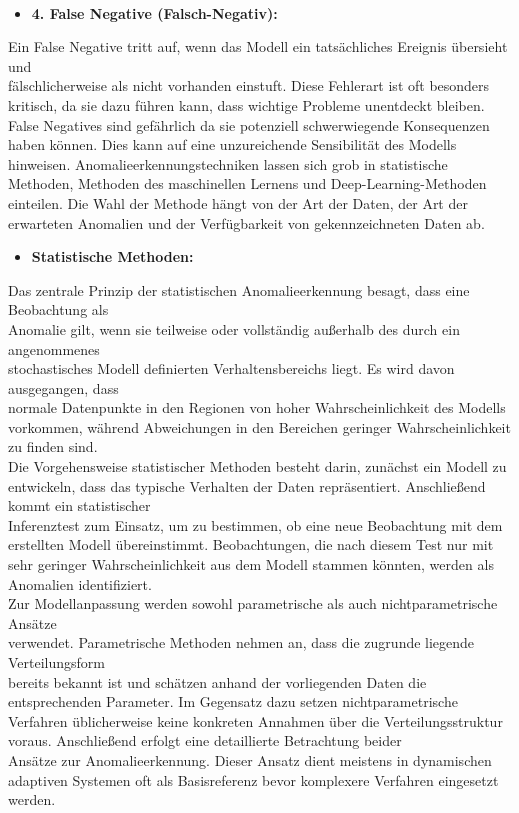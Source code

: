 \\
\begin{itemize} \item \textbf{4. False Negative (Falsch-Negativ):} \end{itemize}
Ein False Negative tritt auf, wenn das Modell ein tatsächliches Ereignis übersieht und \\ fälschlicherweise als nicht vorhanden einstuft. Diese Fehlerart ist oft besonders kritisch, da sie dazu führen kann, dass wichtige Probleme unentdeckt bleiben. False Negatives sind gefährlich da sie potenziell schwerwiegende Konsequenzen haben können. Dies kann auf eine unzureichende Sensibilität des Modells hinweisen\cite{Fehlerkategorie}.
\nAbsatz
Anomalieerkennungstechniken lassen sich grob in statistische Methoden, Methoden des maschinellen Lernens und Deep-Learning-Methoden einteilen. Die Wahl der Methode hängt von der Art der Daten, der Art der erwarteten Anomalien und der Verfügbarkeit von gekennzeichneten Daten ab\cite{LOF}.  \\
\begin{itemize} \item \textbf{Statistische Methoden:} \end{itemize} Das zentrale Prinzip der statistischen Anomalieerkennung besagt, dass eine Beobachtung als \\ Anomalie gilt, wenn sie teilweise oder vollständig außerhalb des durch ein angenommenes \\ stochastisches Modell definierten Verhaltensbereichs liegt. Es wird davon ausgegangen, dass \\ normale Datenpunkte in den Regionen von hoher Wahrscheinlichkeit des Modells vorkommen, während Abweichungen in den Bereichen geringer Wahrscheinlichkeit zu finden sind.\\
Die Vorgehensweise statistischer Methoden besteht darin, zunächst ein Modell zu entwickeln, dass das typische Verhalten der Daten repräsentiert. Anschließend kommt ein statistischer \\ Inferenztest zum Einsatz, um zu bestimmen, ob eine neue Beobachtung mit dem erstellten Modell übereinstimmt. Beobachtungen, die nach diesem Test nur mit sehr geringer Wahrscheinlichkeit aus dem Modell stammen könnten, werden als Anomalien identifiziert.\\
Zur Modellanpassung werden sowohl parametrische als auch nichtparametrische Ansätze \\ verwendet. Parametrische Methoden nehmen an, dass die zugrunde liegende Verteilungsform \\ bereits bekannt ist und schätzen anhand der vorliegenden Daten die entsprechenden Parameter. Im Gegensatz dazu setzen nichtparametrische Verfahren üblicherweise keine konkreten Annahmen über die Verteilungsstruktur voraus. Anschließend erfolgt eine detaillierte Betrachtung beider \\ Ansätze zur Anomalieerkennung. Dieser Ansatz dient meistens in dynamischen \\ adaptiven Systemen oft als Basisreferenz bevor komplexere Verfahren eingesetzt werden\cite{LOF}.
